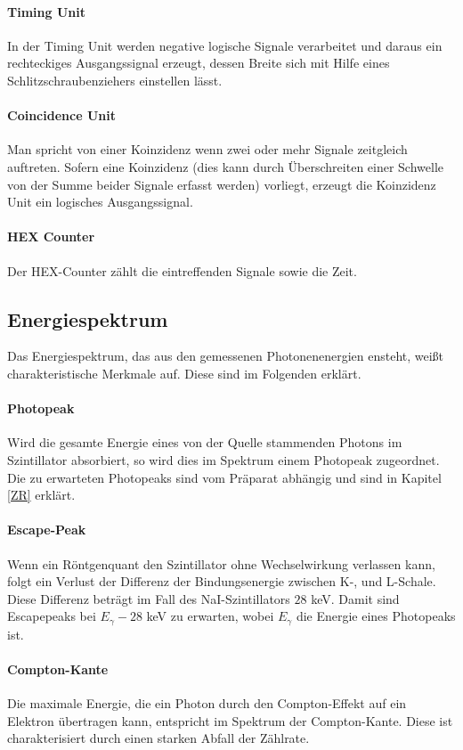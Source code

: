 \documentclass[12pt,listof=totoc]{scrartcl}
\begin{document}
 \paragraph{Timing Unit}
 In der Timing Unit werden negative logische Signale verarbeitet und daraus ein rechteckiges Ausgangssignal erzeugt, dessen Breite sich mit Hilfe eines Schlitzschraubenziehers einstellen lässt.
 \paragraph{Coincidence Unit}
 Man spricht von einer Koinzidenz wenn zwei oder mehr Signale zeitgleich auftreten. Sofern eine Koinzidenz (dies kann durch Überschreiten einer Schwelle von der Summe beider Signale erfasst werden) vorliegt, erzeugt die Koinzidenz Unit ein logisches Ausgangssignal.
 \paragraph{HEX Counter}
Der HEX-Counter zählt die eintreffenden Signale sowie die Zeit.

\subsection{Energiespektrum}

Das Energiespektrum, das aus den gemessenen Photonenenergien ensteht, weißt  charakteristische Merkmale auf. Diese sind im Folgenden erklärt. 
 
 
 \paragraph{Photopeak}
 
 Wird die gesamte Energie eines von der Quelle stammenden Photons im Szintillator absorbiert, so wird dies im Spektrum einem Photopeak zugeordnet. Die zu erwarteten Photopeaks sind vom Präparat abhängig und sind in Kapitel \ref{ZR} erklärt.
 \paragraph{Escape-Peak}
 Wenn ein Röntgenquant den Szintillator ohne Wechselwirkung verlassen kann, folgt ein Verlust der Differenz der Bindungsenergie zwischen K-, und L-Schale. Diese Differenz beträgt im Fall des NaI-Szintillators $28$ keV. Damit sind Escapepeaks bei $E_\gamma - 28$ keV zu erwarten, wobei $E_\gamma$ die Energie eines Photopeaks ist.

 \paragraph{Compton-Kante}
 Die maximale Energie, die ein Photon durch den Compton-Effekt auf ein Elektron übertragen kann, entspricht im Spektrum der Compton-Kante. Diese ist charakterisiert durch einen starken Abfall der Zählrate.
 
\end{document}
